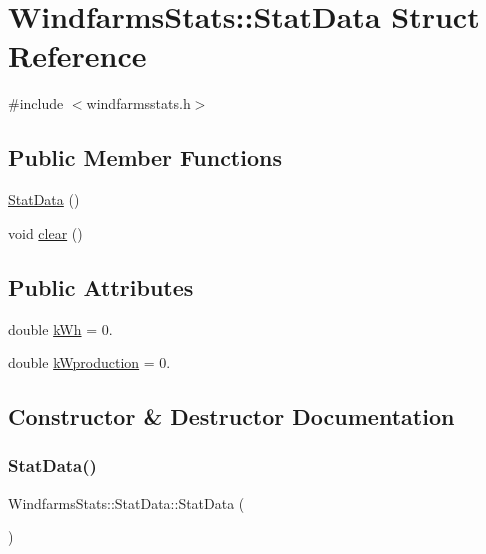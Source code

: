 \hypertarget{struct_windfarms_stats_1_1_stat_data}{}\section{Windfarms\+Stats\+::Stat\+Data Struct Reference}
\label{struct_windfarms_stats_1_1_stat_data}


{\ttfamily \#include $<$windfarmsstats.\+h$>$}

\subsection*{Public Member Functions}
\begin{DoxyCompactItemize}
\item 
\mbox{\hyperlink{struct_windfarms_stats_1_1_stat_data_a1018fcaafb36b4c4b5344b43cf540456}{Stat\+Data}} ()
\item 
void \mbox{\hyperlink{struct_windfarms_stats_1_1_stat_data_ab4abd0b7ea7c2c9497ef6beebbe205ef}{clear}} ()
\end{DoxyCompactItemize}
\subsection*{Public Attributes}
\begin{DoxyCompactItemize}
\item 
double \mbox{\hyperlink{struct_windfarms_stats_1_1_stat_data_a7450fb4d92e4d3573d276aa155a438da}{k\+Wh}} = 0.
\item 
double \mbox{\hyperlink{struct_windfarms_stats_1_1_stat_data_a56fd3120881cc0b82fcfcb9ab99932ab}{k\+Wproduction}} = 0.
\end{DoxyCompactItemize}


\subsection{Constructor \& Destructor Documentation}
\mbox{\label{struct_windfarms_stats_1_1_stat_data_a1018fcaafb36b4c4b5344b43cf540456}} 
\subsubsection{\texorpdfstring{StatData()}{StatData()}}
{\footnotesize\ttfamily Windfarms\+Stats\+::\+Stat\+Data\+::\+Stat\+Data (\begin{DoxyParamCaption}{ }\end{DoxyParamCaption})\hspace{0.3cm}{\ttfamily [inline]}}



